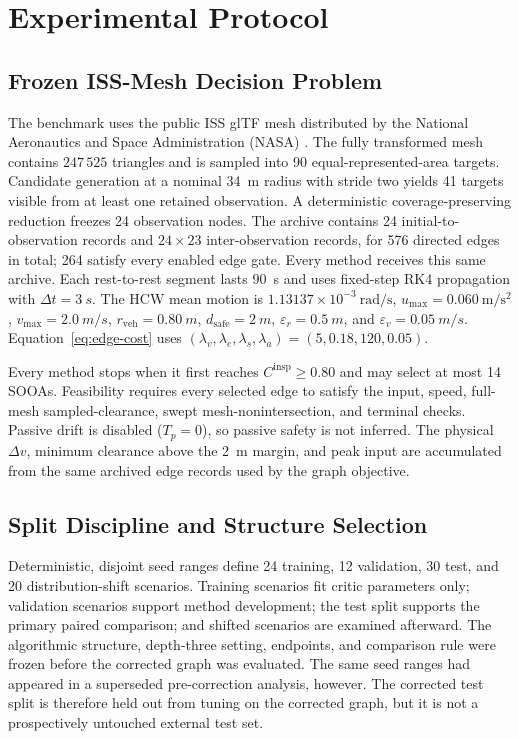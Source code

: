 \documentclass{IEEEtaes}
\newcommand{\dt}{\Delta t}
\newcommand{\unit}[2]{#1~#2}
\theoremstyle{remark}
\theoremstyle{plain}
\begin{document}
\section{Experimental Protocol}
\label{sec:simulation}

\subsection{Frozen ISS-Mesh Decision Problem}

The benchmark uses the public ISS glTF mesh distributed by the National Aeronautics and Space Administration (NASA) \cite{nasa_iss_gltf_model}. The fully transformed mesh contains $247\,525$ triangles and is sampled into 90 equal-represented-area targets. Candidate generation at a nominal \unit{34}{m} radius with stride two yields 41 targets visible from at least one retained observation. A deterministic coverage-preserving reduction freezes 24 observation nodes. The archive contains 24 initial-to-observation records and $24\times23$ inter-observation records, for 576 directed edges in total; 264 satisfy every enabled edge gate. Every method receives this same archive. Each rest-to-rest segment lasts \unit{90}{s} and uses fixed-step RK4 propagation with $\dt=\unit{3}{s}$. The HCW mean motion is $1.13137\times10^{-3}~\mathrm{rad/s}$, $u_{\max}=0.060~\mathrm{m/s^2}$, $v_{\max}=\unit{2.0}{m/s}$, $r_{\mathrm{veh}}=\unit{0.80}{m}$, $d_{\mathrm{safe}}=\unit{2}{m}$, $\varepsilon_r=\unit{0.5}{m}$, and $\varepsilon_v=\unit{0.05}{m/s}$. Equation~\eqref{eq:edge-cost} uses $(\lambda_v,\lambda_e,\lambda_s,\lambda_a)=(5,0.18,120,0.05)$.

Every method stops when it first reaches $C^{\mathrm{insp}}\ge0.80$ and may select at most 14 SOOAs. Feasibility requires every selected edge to satisfy the input, speed, full-mesh sampled-clearance, swept mesh-nonintersection, and terminal checks. Passive drift is disabled ($T_p=0$), so passive safety is not inferred. The physical $\Delta v$, minimum clearance above the \unit{2}{m} margin, and peak input are accumulated from the same archived edge records used by the graph objective.

\subsection{Split Discipline and Structure Selection}

Deterministic, disjoint seed ranges define 24 training, 12 validation, 30 test, and 20 distribution-shift scenarios. Training scenarios fit critic parameters only; validation scenarios support method development; the test split supports the primary paired comparison; and shifted scenarios are examined afterward. The algorithmic structure, depth-three setting, endpoints, and comparison rule were frozen before the corrected graph was evaluated. The same seed ranges had appeared in a superseded pre-correction analysis, however. The corrected test split is therefore held out from tuning on the corrected graph, but it is not a prospectively untouched external test set.
\end{document}
